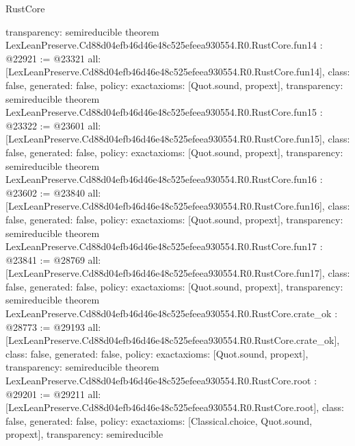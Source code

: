 \begin{lexlean}{RustCore}
\begin{coremodule}
{  transparency: semireducible
}
theorem LexLeanPreserve.Cd88d04efb46d46e48c525efeea930554.R0.RustCore.fun14 : @22921 := @23321 {
  all: [LexLeanPreserve.Cd88d04efb46d46e48c525efeea930554.R0.RustCore.fun14],
  class: false,
  generated: false,
  policy: exact{axioms: [Quot.sound, propext]},
  transparency: semireducible
}
theorem LexLeanPreserve.Cd88d04efb46d46e48c525efeea930554.R0.RustCore.fun15 : @23322 := @23601 {
  all: [LexLeanPreserve.Cd88d04efb46d46e48c525efeea930554.R0.RustCore.fun15],
  class: false,
  generated: false,
  policy: exact{axioms: [Quot.sound, propext]},
  transparency: semireducible
}
theorem LexLeanPreserve.Cd88d04efb46d46e48c525efeea930554.R0.RustCore.fun16 : @23602 := @23840 {
  all: [LexLeanPreserve.Cd88d04efb46d46e48c525efeea930554.R0.RustCore.fun16],
  class: false,
  generated: false,
  policy: exact{axioms: [Quot.sound, propext]},
  transparency: semireducible
}
theorem LexLeanPreserve.Cd88d04efb46d46e48c525efeea930554.R0.RustCore.fun17 : @23841 := @28769 {
  all: [LexLeanPreserve.Cd88d04efb46d46e48c525efeea930554.R0.RustCore.fun17],
  class: false,
  generated: false,
  policy: exact{axioms: [Quot.sound, propext]},
  transparency: semireducible
}
theorem LexLeanPreserve.Cd88d04efb46d46e48c525efeea930554.R0.RustCore.crate_ok : @28773 := @29193 {
  all: [LexLeanPreserve.Cd88d04efb46d46e48c525efeea930554.R0.RustCore.crate_ok],
  class: false,
  generated: false,
  policy: exact{axioms: [Quot.sound, propext]},
  transparency: semireducible
}
theorem LexLeanPreserve.Cd88d04efb46d46e48c525efeea930554.R0.RustCore.root : @29201 := @29211 {
  all: [LexLeanPreserve.Cd88d04efb46d46e48c525efeea930554.R0.RustCore.root],
  class: false,
  generated: false,
  policy: exact{axioms: [Classical.choice, Quot.sound, propext]},
  transparency: semireducible
}


\end{coremodule}
\end{lexlean}
